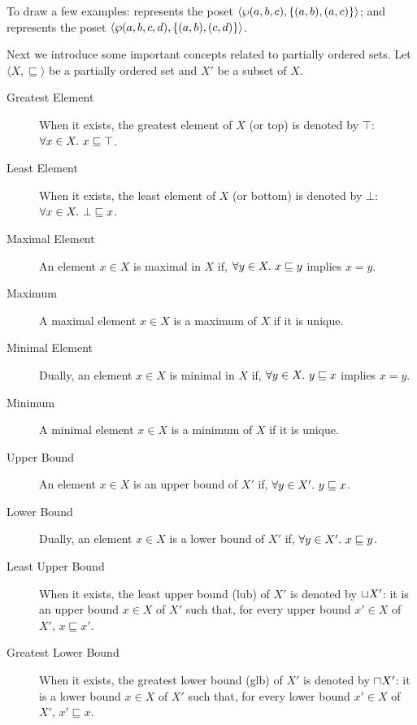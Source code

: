 \begin{example}
  To draw a few examples:  represents the poset $\langle \wp(a, b, c), \{(a, b), (a, c)\}\rangle$; and  represents the poset $\langle \wp(a, b, c, d), \{(a, b), (c, d)\}\rangle$.
\end{example}

Next we introduce some important concepts related to partially ordered sets.
Let $\langle X, \sqsubseteq \rangle$ be a partially ordered set and $X'$ be a subset of $X$.
\begin{description}
  \item[Greatest Element] When it exists, the greatest element of $X$ (or top) is denoted by $\top$: $\forall x \in X.~ x \sqsubseteq \top$.
  \item[Least Element] When it exists, the least element of $X$ (or bottom) is denoted by $\bot$: $\forall x \in X.~ \bot \sqsubseteq x$.
  \item[Maximal Element] An element $x \in X$ is maximal in $X$ if, $\forall y \in X.~ x \sqsubseteq y$ implies $x = y$.
  \item[Maximum] A maximal element $x \in X$ is a maximum of $X$ if it is unique.
  \item[Minimal Element] Dually, an element $x \in X$ is minimal in $X$ if, $\forall y \in X.~ y \sqsubseteq x$ implies $x = y$.
  \item[Minimum] A minimal element $x \in X$ is a minimum of $X$ if it is unique.
  \item[Upper Bound] An element $x \in X$ is an upper bound of $X'$ if, $\forall y \in X'.~ y \sqsubseteq x$.
  \item[Lower Bound] Dually, an element $x \in X$ is a lower bound of $X'$ if, $\forall y \in X'.~ x \sqsubseteq y$.
  \item[Least Upper Bound] When it exists, the least upper bound (lub) of $X'$ is denoted by $\sqcup X'$: it is an upper bound $x \in X$ of $X'$ such that, for every upper bound $x' \in X$ of $X'$, $x \sqsubseteq x'$.
  \item[Greatest Lower Bound] When it exists, the greatest lower bound (glb) of $X'$ is denoted by $\sqcap X'$: it is a lower bound $x \in X$ of $X'$ such that, for every lower bound $x' \in X$ of $X'$, $x' \sqsubseteq x$.
\end{description}

